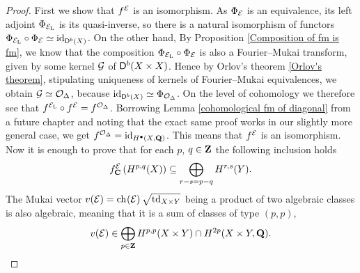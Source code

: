 \begin{proof}
    First we show that $f^{\mathcal E}$ is an isomorphism. As $\Phi_{\mathcal E}$ is an equivalence, its left adjoint $\Phi_{\mathcal E_\mathrm{L}}$ is its quasi-inverse, so there is a natural isomorphism of functors $\Phi_{\mathcal E_\mathrm{L}} \circ \Phi_{\mathcal E} \simeq \operatorname{id}_{\mathsf{D}^b(X)}$. On the other hand, By Proposition \ref{Composition of fm is fm}, we know that the composition $\Phi_{\mathcal E_\mathrm{L}} \circ \Phi_{\mathcal E}$ is also a Fourier--Mukai transform, given by some kernel $\mathcal G$ of $\mathsf{D}^b(X \times X)$. Hence by Orlov's theorem \ref{Orlov's theorem}, stipulating uniqueness of kernels of Fourier--Mukai equivalences, we obtain $\mathcal G \simeq {\mathcal{O}_{\Delta}}$, because $\operatorname{id}_{\mathsf{D}^b(X)} \simeq \Phi_{{\mathcal{O}_{\Delta}}}$. On the level of cohomology we therefore see that $f^{\mathcal E_\mathrm{L}} \circ f^{\mathcal E} = f^{{\mathcal{O}_{\Delta}}}$. Borrowing Lemma \ref{cohomological fm of diagonal} from a future chapter and noting that the exact same proof works in our slightly more general case, we get $f^{{\mathcal{O}_{\Delta}}} = \operatorname{id}_{H^{\bullet}(X, \mathbf Q)}$. This means that $f^{\mathcal E}$ is an isomorphism.
    Now it is enough to prove that for each $p$, $q \in \mathbf Z$ the following inclusion holds
    \begin{equation}
        \label{eq: Hodge lattice, fm transform}
        f^{\mathcal E}_\mathbf C\left(H^{p,q}(X)\right) \subseteq \bigoplus_{r - s = p - q} H^{r,s}(Y).
    \end{equation}
    The Mukai vector $v(\E) = \ch[]{\E}\sqrt{\tdclass{X \times Y}}$ being a product of two algebraic classes is also algebraic, meaning that it is a sum of classes of type $(p,p)$, \ie
    \[
        v(\mathcal E) \in \bigoplus_{p \in \mathbf Z} H^{p,p}(X \times Y) \cap H^{2p}(X \times Y, \mathbf Q).
    \] 

\end{proof}
